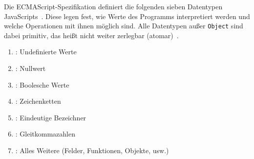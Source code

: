 Die ECMAScript-Spezifikation definiert die folgenden sieben Datentypen JavaScripts~\autocite[25]{ECMASCRIPT:2019}. Diese legen fest, wie Werte des Programms interpretiert werden und welche Operationen mit ihnen möglich sind. Alle Datentypen außer \texttt{Object} sind dabei primitiv, das heißt nicht weiter zerlegbar (atomar)~\autocite[8]{ECMASCRIPT:2019}.
\begin{enumerate}[midpenalty=1000]
  \item {}: Undefinierte Werte
  \item {}: Nullwert
  \item {}: Boolesche Werte
  \item {}: Zeichenketten
  \item {}: Eindeutige Bezeichner
  \item {}: Gleitkommazahlen
  \item {}: Alles Weitere (Felder, Funktionen, Objekte, usw.)
\end{enumerate}


